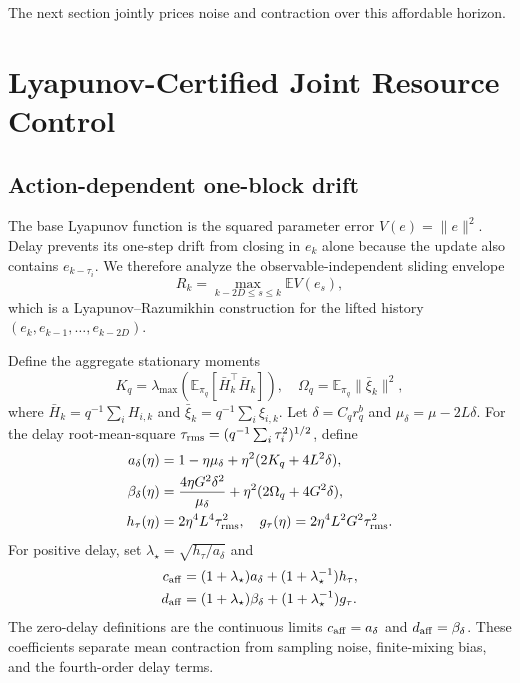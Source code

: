 \documentclass[journal]{IEEEtran}
\newcommand{\E}{\mathbb{E}}
\begin{document}
The next section jointly prices noise and contraction over this affordable horizon.

\section{Lyapunov-Certified Joint Resource Control}
\subsection{Action-dependent one-block drift}
The base Lyapunov function is the squared parameter error $V(e)=\|e\|^2$.
Delay prevents its one-step drift from closing in $e_k$ alone because the update also contains $e_{k-\tau_i}$.
We therefore analyze the observable-independent sliding envelope
\begin{equation}
R_k=\max_{k-2D\le s\le k}\E V(e_s),
\label{eq:sliding-envelope}
\end{equation}
which is a Lyapunov--Razumikhin construction for the lifted history $(e_k,e_{k-1},\ldots,e_{k-2D})$.

Define the aggregate stationary moments
\begin{equation}
K_q=\lambda_{\max}\!\left(\E_{\pi_q}[\bar H_k^\top\bar H_k]\right),
\quad
\Omega_q=\E_{\pi_q}\|\bar\xi_k\|^2,
\end{equation}
where $\bar H_k=q^{-1}\sum_iH_{i,k}$ and $\bar\xi_k=q^{-1}\sum_i\xi_{i,k}$.
Let $\delta=C_qr_q^b$ and $\mu_\delta=\mu-2L\delta$.
For the delay root-mean-square $\tau_{\rm rms}=(q^{-1}\sum_i\tau_i^2)^{1/2}$, define
\begin{align}
a_\delta(\eta)&=1-\eta\mu_\delta+\eta^2(2K_q+4L^2\delta),\nonumber\\
\beta_\delta(\eta)&=\frac{4\eta G^2\delta^2}{\mu_\delta}+\eta^2(2\Omega_q+4G^2\delta),\nonumber\\
h_\tau(\eta)&=2\eta^4L^4\tau_{\rm rms}^2,
\quad
g_\tau(\eta)=2\eta^4L^2G^2\tau_{\rm rms}^2.
\label{eq:affine-terms}
\end{align}
For positive delay, set $\lambda_\star=\sqrt{h_\tau/a_\delta}$ and
\begin{align}
c_{\rm aff}&=(1+\lambda_\star)a_\delta+(1+\lambda_\star^{-1})h_\tau,\nonumber\\
d_{\rm aff}&=(1+\lambda_\star)\beta_\delta+(1+\lambda_\star^{-1})g_\tau.
\label{eq:affine-cd}
\end{align}
The zero-delay definitions are the continuous limits $c_{\rm aff}=a_\delta$ and $d_{\rm aff}=\beta_\delta$.
These coefficients separate mean contraction from sampling noise, finite-mixing bias, and the fourth-order delay terms.
\end{document}
